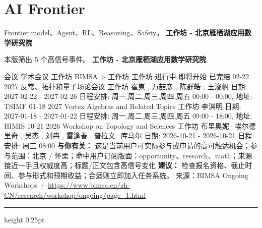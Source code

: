 \documentclass[10.5pt]{ctexart}
\begin{document}
\section*{AI Frontier}
{\color{ormuted} Frontier model、Agent、RL、Reasoning、Safety。}
\vspace{2mm}
{\LARGE\bfseries 工作坊 - 北京雁栖湖应用数学研究院}\par
\vspace{1mm}
{\color{ormuted} 本版筛出 5 个高信号事件。}
\vspace{3mm}
{\Large\bfseries 工作坊 - 北京雁栖湖应用数学研究院}\par
会议 学术会议 工作坊 BIMSA > 工作坊 工作坊 进行中 即将开始 已完结 02-22 2027 反常、拓扑和量子场论会议 工作坊 崔嵬 , 万喆彦 , 陈群皓 , 王浚帆 日期: 2027-02-22 - 2027-02-26 日程安排: 周一,周二,周三,周四,周五 00:00 - 00:00, 地址: TSIMF 01-18 2027 Vertex Algebras and Related Topics 工作坊 李淇明 日期: 2027-01-18 - 2027-01-22 日程安排: 周一,周二,周三,周四,周五 09:00 - 18:00, 地址: HIMIS 10-21 2026 Workshop on Topology and Sciences 工作坊 布里奥妮·埃尔德里奇 , 吴杰 , 刘冉 , 雷逢春 , 普拉文·库马尔 日期: 2026-10-21 - 2026-10-21 日程安排: 周三 08:00
\textbf{与你有关：} 这是当前用户可实际参与或申请的高可触达机会；参与范围：北京 / 怀柔；命中用户订阅版面：opportunity、research、math；来源接近一手且权威度高；标题/正文包含高信号变化
\textbf{建议：} 检查报名资格、截止时间、参与形式和预期收益；合适则立即加入任务系统。
{\footnotesize\color{ormuted} 来源：BIMSA Ongoing Workshops · \url{https://www.bimsa.cn/zh-CN/research/workshop/ongoing/page_1.html}}
\vspace{4mm}
\hrule height 0.25pt
\vspace{3mm}
\end{document}
